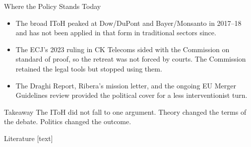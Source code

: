 \documentclass[10pt, aspectratio=169]{beamer}
\begin{document}
\begin{frame}{Where the Policy Stands Today}
  \begin{itemize}
    \item The broad IToH peaked at Dow/DuPont and
          Bayer/Monsanto in 2017--18 and has not been
          applied in that form in traditional sectors since.
    \item The ECJ's 2023 ruling in CK Telecoms sided with
          the Commission on standard of proof, so the
          retreat was not forced by courts. The Commission
          retained the legal tools but stopped using them.
    \item The Draghi Report, Ribera's mission letter, and
          the ongoing EU Merger Guidelines review provided the political
          cover for a less interventionist turn.
  \end{itemize}
  \begin{block}{Takeaway}
    The IToH did not fall to one argument.
    Theory changed the terms of the debate.
    Politics changed the outcome.
  \end{block}
\end{frame}


\appendix

\begin{frame}[allowframebreaks]{Literature}
    \footnotesize
    [text] %
    
    
    \nocite{*} %
     
\end{frame}


\end{document}
